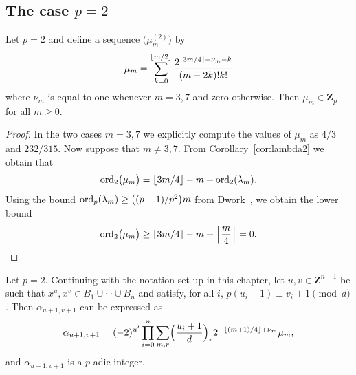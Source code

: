 
\subsection{The case $p = 2$}

\begin{lem} \label{lem:mu2}
Let $p = 2$ and define a sequence $\bigl(\mu_m^{(2)}\bigr)$ by 
\begin{equation*}
\mu_m = 
    \sum_{k=0}^{\left\lfloor m/2\right\rfloor} \frac{2^{\left\lfloor3m/4\right\rfloor - \nu_m - k}}{(m-2k)! k!}
\end{equation*}
where $\nu_m$ is equal to one whenever $m = 3, 7$ and zero otherwise. 
Then $\mu_m \in \mathbf{Z}_p$ for all $m \geq 0$.
\end{lem}

\begin{proof}
In the two cases $m = 3, 7$ we explicitly compute the values of 
$\mu_m$ as $4/3$ and $232/315$.  Now suppose that $m \neq 3, 7$. 
From Corollary~\ref{cor:lambda2} we obtain that 
\begin{equation*}
\operatorname{ord}_2 \bigl(\mu_m\bigr) 
    = \left\lfloor3m/4\right\rfloor - m + \operatorname{ord}_2(\lambda_m).
\end{equation*}
Using the bound $\operatorname{ord}_p(\lambda_m) \geq \bigl((p-1)/p^2\bigr) m$ from 
Dwork~\citep[Pages~55--57]{Dwork62}, we obtain the lower bound 
\begin{equation*}
\operatorname{ord}_2 \bigl(\mu_m\bigr) 
    \geq \left\lfloor3m/4\right\rfloor - m + \left\lceil\frac{m}{4}\right\rceil = 0. \qedhere
\end{equation*}
\end{proof}

\begin{thm} \label{thm:alpha2}
Let $p = 2$. 
Continuing with the notation set up in this chapter, let 
$u, v \in \mathbf{Z}^{n+1}$ be such that 
$x^u, x^v \in B_1 \cup \dotsb \cup B_n$ and satisfy, 
for all $i$, $p (u_i + 1) \equiv v_i + 1 \pmod{d}$. 
Then $\alpha_{u+1,v+1}$ can be expressed as 
\begin{equation} \label{eq:alpha2.0}
\alpha_{u+1,v+1} = (-2)^{u'} \prod_{i=0}^n \sum_{m,r} 
    \Bigl(\frac{u_i+1}{d}\Bigr)_r 2^{-\left\lfloor(m+1)/4\right\rfloor+\nu_m} \mu_m, 
\end{equation}
and $\alpha_{u+1,v+1}$ is a $p$-adic integer.
\end{thm}

